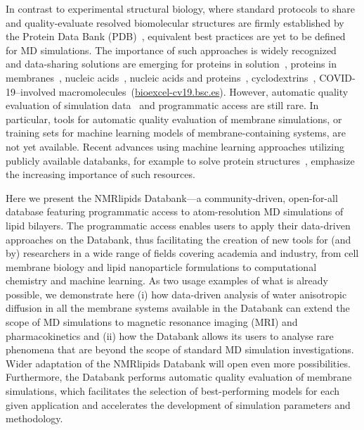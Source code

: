 \documentclass[fleqn,10pt]{wlscirep}
\begin{document}
In contrast to experimental structural biology, where standard protocols to share and quality-evaluate resolved biomolecular structures are firmly established by the Protein Data Bank (PDB)~\cite{montelione13}, equivalent best practices are yet to be defined for MD simulations. The importance of such approaches is widely recognized~\cite{feig99,tai04,silva06,abraham19,hildebrand19,hospital20,abriata20,espigares20} and data-sharing solutions are emerging for proteins in solution~\cite{meyer10,kamp10}, proteins in membranes~\cite{newport19,espigares20,leston22}, nucleic acids~\cite{hospital16}, nucleic acids and proteins~\cite{bekker20}, cyclodextrins~\cite{mixcoha16}, COVID-19--involved macromolecules~(\href{https://bioexcel-cv19.bsc.es}{bioexcel-cv19.bsc.es}). However, automatic quality evaluation of simulation data~\cite{meyer10,hospital16} and programmatic access are still rare. In particular, tools for automatic quality evaluation of membrane simulations, or training sets for machine learning models of membrane-containing systems, are not yet available. Recent advances using machine learning approaches utilizing publicly available databanks, for example to solve protein structures~\cite{jumper21}, emphasize the increasing importance of such resources. 


Here we present the NMRlipids Databank---a community-driven, open-for-all database featuring programmatic access to atom-resolution MD simulations of lipid bilayers. The programmatic access enables users to apply their data-driven approaches on the Databank, thus facilitating the creation of new tools for (and by) researchers in a wide range of fields covering academia and industry, from cell membrane biology and lipid nanoparticle formulations to computational chemistry and machine learning. As two usage examples of what is already possible, we demonstrate here (i) how data-driven analysis of water anisotropic diffusion in all the membrane systems available in the Databank can extend the scope of MD simulations to magnetic resonance imaging (MRI) and pharmacokinetics and (ii) how the Databank allows its users to analyse rare phenomena that are beyond the scope of standard MD simulation investigations. Wider adaptation of the NMRlipids Databank will open even more possibilities. Furthermore, the Databank performs automatic quality evaluation of membrane simulations, which facilitates the selection of best-performing models for each given application and accelerates the development of simulation parameters and methodology.  
\end{document}
